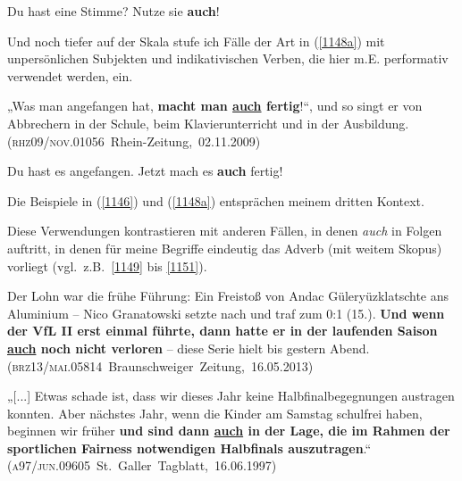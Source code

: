 \begin{exe}
	\ex\label{1147} 
	Du hast eine Stimme? Nutze sie \textbf{auch}!
\end{exe}
Und noch tiefer auf der Skala stufe ich Fälle der Art in (\ref{1148a}) mit unpersönlichen Subjekten und indikativischen Verben, die hier m.E. performativ verwendet werden, ein.

\begin{exe}
	\ex\label{1148a} 

	„Was man angefangen hat, \textbf{macht man \ul{auch} fertig}!“, und so singt er von Abbrechern in der Schule, beim Klavierunterricht 		und in der Ausbildung. 
	\hfill\hbox{(\textsc{rhz09/nov.01056} Rhein-Zeitung, 02.11.2009)}
\end{exe}

\begin{exe}
	\ex\label{1148} 
	Du hast es angefangen. Jetzt mach es \textbf{auch} fertig!
\end{exe}
Die Beispiele in (\ref{1146}) und (\ref{1148a}) entsprächen meinem dritten Kontext. 

Diese Verwendungen kontrastieren mit anderen Fällen, in denen \textit{auch} in Folgen auftritt, in denen für meine Begriffe eindeutig das Adverb (mit weitem Skopus) vorliegt (vgl.\ z.B.\ \ref{1149} bis \ref{1151}).

\begin{exe}

	\ex\label{1149} 	

	{Der Lohn war die frühe Führung: Ein Freistoß von Andac Güleryüz\linebreak klatschte ans Aluminium – Nico Granatowski setzte nach und traf zum 0:1 (15.). 				\textbf{Und wenn der VfL II erst einmal führte, dann hatte er in der laufenden Saison \ul{auch} noch nicht verloren} – diese Serie hielt bis 		gestern Abend. 
	\hbox{}\hfill\hbox{(\textsc{brz13/mai.05814} Braunschweiger Zeitung, 16.05.2013)}}\\
\end{exe}

\begin{exe}
	\ex\label{1150} 

	{„[...] Etwas schade ist, dass wir dieses Jahr keine Halbfinalbegegnungen austragen konnten. Aber nächstes Jahr, wenn die Kinder am Samstag 		schulfrei haben, beginnen wir früher \textbf{und sind dann \ul{auch} in der Lage, die im Rahmen der sportlichen Fairness notwendigen Halbfinals 		auszutragen}.“
	\hbox{}\hfill\hbox{(\textsc{a97/jun.09605} St. Galler Tagblatt, 16.06.1997)}}\\
\end{exe}

